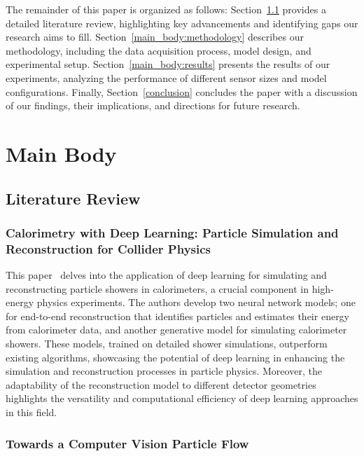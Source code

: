 \documentclass[conference]{IEEEtran}
\begin{document}
The remainder of this paper is organized as follows: Section~\ref{main_body:literature_review} provides a detailed literature review, highlighting key advancements and identifying gaps our research aims to fill. Section~\ref{main_body:methodology} describes our methodology, including the data acquisition process, model design, and experimental setup. Section~\ref{main_body:results} presents the results of our experiments, analyzing the performance of different sensor sizes and model configurations. Finally, Section~\ref{conclusion} concludes the paper with a discussion of our findings, their implications, and directions for future research.

\section{Main Body}\label{main_body}

\subsection{Literature Review}\label{main_body:literature_review}

\subsubsection{Calorimetry with Deep Learning: Particle Simulation and Reconstruction for Collider Physics}

This paper~\cite{Belayneh_2020} delves into the application of deep learning for simulating and reconstructing particle showers in calorimeters, a crucial component in high-energy physics experiments. The authors develop two neural network models; one for end-to-end reconstruction that identifies particles and estimates their energy from calorimeter data, and another generative model for simulating calorimeter showers. These models, trained on detailed shower simulations, outperform existing algorithms, showcasing the potential of deep learning in enhancing the simulation and reconstruction processes in particle physics. Moreover, the adaptability of the reconstruction model to different detector geometries highlights the versatility and computational efficiency of deep learning approaches in this field.

\subsubsection{Towards a Computer Vision Particle Flow}
\end{document}
